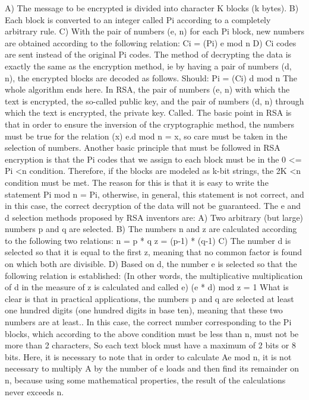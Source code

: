 \begin{flushleft}
A) The message to be encrypted is divided into character K blocks (k bytes).
B) Each block is converted to an integer called Pi according to a completely arbitrary rule.
C) With the pair of numbers (e, n) for each Pi block, new numbers are obtained according to the following relation:
Ci = (Pi) e mod n
D) Ci codes are sent instead of the original Pi codes.
The method of decrypting the data is exactly the same as the encryption method, ie by having a pair of numbers (d, n), the encrypted blocks are decoded as follows. Should:
Pi = (Ci) d mod n
The whole algorithm ends here.
In RSA, the pair of numbers (e, n) with which the text is encrypted, the so-called public key, and the pair of numbers (d, n) through which the text is encrypted, the private key. Called. The basic point in RSA is that in order to ensure the inversion of the cryptographic method, the numbers must be true for the relation (x) e.d mod n = x, so care must be taken in the selection of numbers.
Another basic principle that must be followed in RSA encryption is that the Pi codes that we assign to each block must be in the 0 <= Pi <n condition. Therefore, if the blocks are modeled as k-bit strings, the 2K <n condition must be met. The reason for this is that it is easy to write the statement Pi mod n = Pi, otherwise, in general, this statement is not correct, and in this case, the correct decryption of the data will not be guaranteed.
The e and d selection methods proposed by RSA inventors are:
A) Two arbitrary (but large) numbers p and q are selected.
B) The numbers n and z are calculated according to the following two relations:
n = p * q
z = (p-1) * (q-1)
C) The number d is selected so that it is equal to the first z, meaning that no common factor is found on which both are divisible.
D) Based on d, the number e is selected so that the following relation is established: (In other words, the multiplicative multiplication of d in the measure of z is calculated and called e)
(e * d) mod z = 1
What is clear is that in practical applications, the numbers p and q are selected at least one hundred digits (one hundred digits in base ten), meaning that these two numbers are at least.. In this case, the correct number corresponding to the Pi blocks, which according to the above condition must be less than n, must not be more than 2 characters,
So each text block must have a maximum of 2 bits or 8 bits.
Here, it is necessary to note that in order to calculate Ae mod n, it is not necessary to multiply A by the number of e loads and then find its remainder on n, because using some mathematical properties, the result of the calculations never exceeds n.

\end{flushleft}
